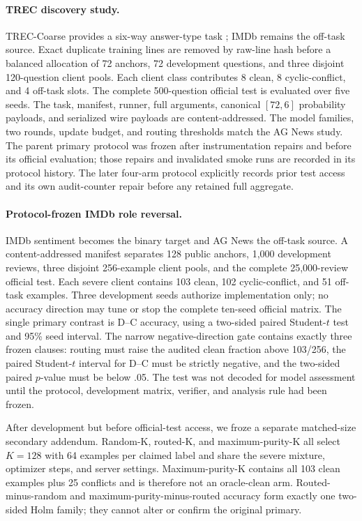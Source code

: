 \documentclass[letterpaper]{article}
\begin{document}
\paragraph{TREC discovery study.}
TREC-Coarse provides a six-way answer-type task \cite{li2002question}; IMDb
remains the off-task source.  Exact duplicate training lines are removed by
raw-line hash before a balanced allocation of 72 anchors, 72 development
questions, and three disjoint 120-question client pools.  Each client class
contributes 8 clean, 8 cyclic-conflict, and 4 off-task slots.  The complete
500-question official test is evaluated over five seeds.  The task, manifest,
runner, full arguments, canonical \([72,6]\) probability payloads, and
serialized wire payloads are content-addressed.  The model families, two
rounds, update budget, and routing thresholds match the AG News study.
The parent primary protocol was frozen after instrumentation repairs and before
its official evaluation; those repairs and invalidated smoke runs are recorded
in its protocol history.  The later four-arm protocol explicitly records prior
test access and its own audit-counter repair before any retained full aggregate.

\paragraph{Protocol-frozen IMDb role reversal.}
IMDb sentiment becomes the binary target and AG News the off-task source.  A
content-addressed manifest separates 128 public anchors, 1,000 development
reviews, three disjoint 256-example client pools, and the complete 25,000-review
official test.  Each severe client contains 103 clean, 102 cyclic-conflict,
and 51 off-task examples.  Three development seeds authorize implementation
only; no accuracy direction may tune or stop the complete ten-seed official
matrix.  The single primary contrast is D--C accuracy, using a two-sided paired
Student-\(t\) test and 95\% seed interval.  The narrow negative-direction gate
contains exactly three frozen clauses: routing must raise the audited clean
fraction above 103/256, the paired Student-\(t\) interval for D--C must be
strictly negative, and the two-sided paired \(p\)-value must be below .05.  The
test was not decoded for model assessment until the protocol, development
matrix, verifier, and analysis rule had been frozen.

After development but before official-test access, we froze a separate
matched-size secondary addendum.  Random-K, routed-K, and maximum-purity-K all
select \(K=128\) with 64 examples per claimed label and share the severe
mixture, optimizer steps, and server settings.  Maximum-purity-K contains all
103 clean examples plus 25 conflicts and is therefore not an oracle-clean arm.
Routed-minus-random and maximum-purity-minus-routed accuracy form exactly one
two-sided Holm family; they cannot alter or confirm the original primary.
\end{document}
